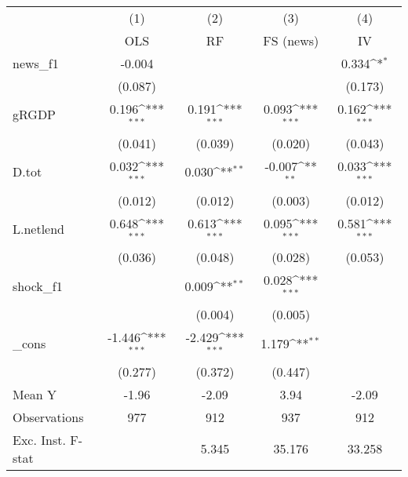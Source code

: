 {
\def\sym#1{\ifmmode^{#1}\else\(^{#1}\)\fi}
\begin{tabular}{l*{4}{c}}
\toprule
            &\multicolumn{1}{c}{(1)}&\multicolumn{1}{c}{(2)}&\multicolumn{1}{c}{(3)}&\multicolumn{1}{c}{(4)}\\
            &\multicolumn{1}{c}{OLS}&\multicolumn{1}{c}{RF}&\multicolumn{1}{c}{FS (news)}&\multicolumn{1}{c}{IV}\\
\midrule
news\_f1     &      -0.004         &                     &                     &       0.334\sym{*}  \\
            &     (0.087)         &                     &                     &     (0.173)         \\
\addlinespace
gRGDP       &       0.196\sym{***}&       0.191\sym{***}&       0.093\sym{***}&       0.162\sym{***}\\
            &     (0.041)         &     (0.039)         &     (0.020)         &     (0.043)         \\
\addlinespace
D.tot       &       0.032\sym{***}&       0.030\sym{**} &      -0.007\sym{**} &       0.033\sym{***}\\
            &     (0.012)         &     (0.012)         &     (0.003)         &     (0.012)         \\
\addlinespace
L.netlend   &       0.648\sym{***}&       0.613\sym{***}&       0.095\sym{***}&       0.581\sym{***}\\
            &     (0.036)         &     (0.048)         &     (0.028)         &     (0.053)         \\
\addlinespace
shock\_f1    &                     &       0.009\sym{**} &       0.028\sym{***}&                     \\
            &                     &     (0.004)         &     (0.005)         &                     \\
\addlinespace
\_cons      &      -1.446\sym{***}&      -2.429\sym{***}&       1.179\sym{**} &                     \\
            &     (0.277)         &     (0.372)         &     (0.447)         &                     \\
\midrule
Mean Y      &       -1.96         &       -2.09         &        3.94         &       -2.09         \\
Observations&         977         &         912         &         937         &         912         \\
Exc. Inst. F-stat&                     &       5.345         &      35.176         &      33.258         \\
\bottomrule
\end{tabular}
}
